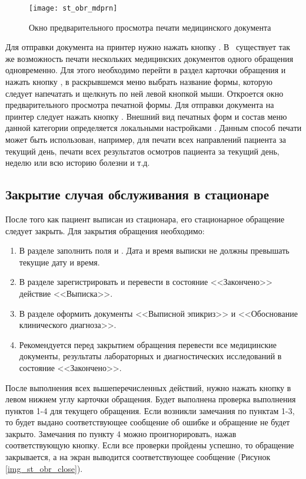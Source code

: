 \begin{figure}[ht]\centering
   \texttt{[image: st\_obr\_mdprn]}
   \caption{Окно предварительного просмотра печати медицинского документа}
   \label{img_st_obr_mdprn}
\end{figure} 

Для отправки документа на принтер нужно нажать кнопку  .
В \tmis~существует так же возможность печати нескольких медицинских документов одного обращения одновременно. Для этого необходимо перейти в раздел  карточки обращения и нажать кнопку , в раскрывшемся меню выбрать название формы, которую следует напечатать и щелкнуть по ней левой кнопкой мыши. Откроется окно предварительного просмотра печатной формы. Для отправки документа на принтер следует нажать кнопку . Внешний вид печатных форм и состав меню данной категории определяется локальными настройками \tmis. Данным способ печати может быть использован, например, для печати всех направлений пациента за текущий день, печати всех результатов осмотров пациента за текущий день, неделю или всю историю болезни и т.д.

\subsection{Закрытие случая обслуживания в стационаре} \label{st_obr_close}

После того как пациент выписан из стационара, его стационарное обращение следует закрыть. Для закрытия обращения необходимо:
\begin{enumerate}
 \item В разделе  заполнить поля  и . Дата и время выписки не должны превышать текущие дату и время.
 \item В разделе  зарегистрировать и перевести в состояние <<Закончено>> действие <<Выписка>>.
 \item В разделе  оформить документы <<Выписной эпикриз>> и <<Обоснование клинического диагноза>>.
 \item Рекомендуется перед закрытием обращения перевести все медицинские документы, результаты лабораторных и диагностических исследований в состояние <<Закончено>>.
\end{enumerate}

После выполнения всех вышеперечисленных действий, нужно нажать кнопку   в левом нижнем углу карточки обращения. Будет выполнена проверка выполнения пунктов 1-4 для текущего обращения. Если возникли замечания по пунктам 1-3, то будет выдано соответствующее сообщение об ошибке и обращение не будет закрыто. Замечания по пункту 4 можно проигнорировать, нажав соответствующую кнопку. Если все проверки пройдены успешно, то обращение закрывается, а на экран выводится соответствующее сообщение (Рисунок \ref{img_st_obr_close}).

